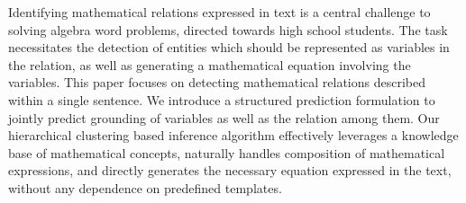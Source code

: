   Identifying mathematical relations expressed in text is a central
  challenge to solving algebra word problems, directed towards high
  school students. The task necessitates the detection of entities
  which should be represented as variables in the relation, as well as
  generating a mathematical equation involving the variables. This
  paper focuses on detecting mathematical relations described within a
  single sentence. We introduce a structured prediction formulation to
  jointly predict grounding of variables as well as the relation among
  them. Our hierarchical clustering based inference algorithm
  effectively leverages a knowledge base of mathematical concepts,
  naturally handles composition of mathematical expressions, and
  directly generates the necessary equation expressed in the text,
  without any dependence on predefined templates.

